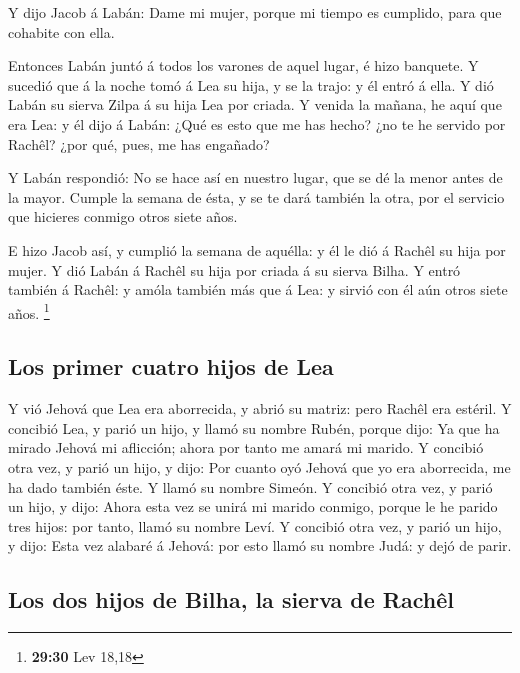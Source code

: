  Y dijo Jacob á Labán: Dame mi mujer, porque mi tiempo es
cumplido, para que cohabite con ella.

 Entonces Labán juntó á todos los varones de aquel lugar,
é hizo banquete.  Y sucedió que á la noche tomó á Lea su
hija, y se la trajo: y él entró á ella.  Y dió Labán su
sierva Zilpa á su hija Lea por criada.  Y venida la
mañana, he aquí que era Lea: y él dijo á Labán: ¿Qué es esto que me has
hecho? ¿no te he servido por Rachêl? ¿por qué, pues, me has engañado?

 Y Labán respondió: No se hace así en nuestro lugar, que
se dé la menor antes de la mayor.  Cumple la semana de
ésta, y se te dará también la otra, por el servicio que hicieres conmigo
otros siete años.

 E hizo Jacob así, y cumplió la semana de aquélla: y él
le dió á Rachêl su hija por mujer.  Y dió Labán á Rachêl
su hija por criada á su sierva Bilha.  Y entró también á
Rachêl: y amóla también más que á Lea: y sirvió con él aún otros siete
años. \footnote{\textbf{29:30} Lev 18,18}

\hypertarget{los-primer-cuatro-hijos-de-lea}{%
\subsection{Los primer cuatro hijos de
Lea}\label{los-primer-cuatro-hijos-de-lea}}

 Y vió Jehová que Lea era aborrecida, y abrió su matriz:
pero Rachêl era estéril.  Y concibió Lea, y parió un
hijo, y llamó su nombre Rubén, porque dijo: Ya que ha mirado Jehová mi
aflicción; ahora por tanto me amará mi marido.  Y
concibió otra vez, y parió un hijo, y dijo: Por cuanto oyó Jehová que yo
era aborrecida, me ha dado también éste. Y llamó su nombre Simeón.
 Y concibió otra vez, y parió un hijo, y dijo: Ahora esta
vez se unirá mi marido conmigo, porque le he parido tres hijos: por
tanto, llamó su nombre Leví.  Y concibió otra vez, y
parió un hijo, y dijo: Esta vez alabaré á Jehová: por esto llamó su
nombre Judá: y dejó de parir.

\hypertarget{los-dos-hijos-de-bilha-la-sierva-de-rachuxeal}{%
\subsection{Los dos hijos de Bilha, la sierva de
Rachêl}\label{los-dos-hijos-de-bilha-la-sierva-de-rachuxeal}}

